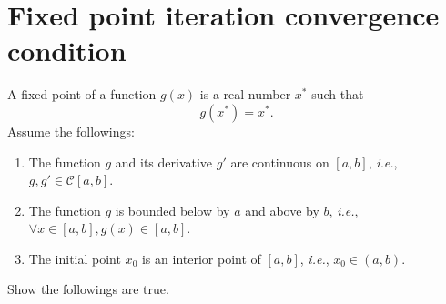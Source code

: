\section{Fixed point iteration convergence condition\label{fixedpoint}}
A fixed point of a function \(g(x)\) is a real number \(x^*\) such that
\[ g(x^*)=x^*. \]
Assume the followings:
\begin{enumerate}
	\item The function $g$ and its derivative $g'$ are continuous on \([a, b]\), \textit{i.e.}, \(g,g'\in\mathcal{C}[a,b]\).
	\item The function $g$ is bounded below by $a$ and above by $b$, \textit{i.e.}, \(\forall x\in[a,b],g(x)\in[a, b]\).
	\item The initial point \(x_0\) is an interior point of \([a,b]\), \textit{i.e.}, \(x_0\in(a, b)\).
\end{enumerate}
Show the followings are true.
